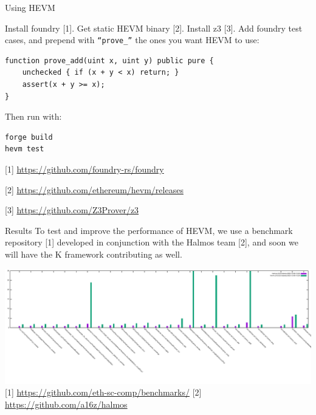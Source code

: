 \documentclass[aspectratio=169]{beamer}
\begin{document}
\begin{frame}[fragile=singleslide]{Using HEVM}

Install foundry [1]. Get static HEVM binary [2]. Install z3 [3]. Add foundry test cases, and prepend with \texttt{``prove\_''} the ones you want HEVM to use:

\begin{Verbatim}[frame=single, framerule=0.2mm, framesep=2mm,fontsize=\footnotesize]
function prove_add(uint x, uint y) public pure {
    unchecked { if (x + y < x) return; }
    assert(x + y >= x);
}
\end{Verbatim}

Then run with:

\begin{Verbatim}[frame=single, framerule=0.2mm, framesep=2mm,fontsize=\footnotesize]
forge build
hevm test
\end{Verbatim}


\bigskip

[1] \url{https://github.com/foundry-rs/foundry}

[2] \url{https://github.com/ethereum/hevm/releases}

[3] \url{https://github.com/Z3Prover/z3}
\end{frame}


\begin{frame}[fragile=singleslide]{Results}
\small
To test and improve the performance of HEVM, we use a benchmark repository [1] developed in conjunction with the Halmos team [2], and soon we will have the K framework contributing as well.

\includegraphics[scale=0.75]{boxchart}
[1] \url{https://github.com/eth-sc-comp/benchmarks/}
[2] \url{https://github.com/a16z/halmos}
\end{frame}


%
%
%
%
%
%
\end{document}
